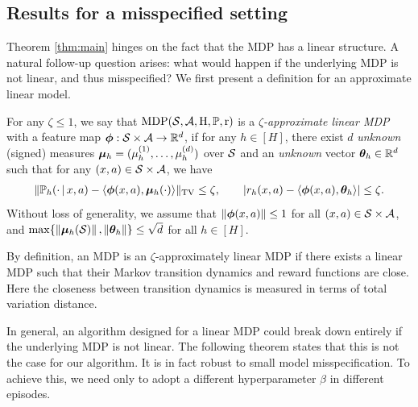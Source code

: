 

\subsection{Results for a misspecified setting}

Theorem \ref{thm:main} hinges on the fact that the MDP has a linear structure. A natural follow-up question arises: what would happen if the underlying MDP is not linear, and thus misspecified? We first present a definition for an approximate linear model.

 

\begin{assumption}\label{assumption:nearly_linear} For any $\zeta\le 1$, we say that
$\rm{MDP}(\mathcal{S}, \mathcal{A}, H, \mathbb{P}, r)$ is a \emph{$\zeta$-approximate linear MDP} with a feature map $\bm{\phi}: \mathcal{S} \times \mathcal{A} \rightarrow \mathbb{R}^d$, if for any $h\in [H]$, there exist $d$ \emph{unknown} (signed) measures $\bm{\mu}_h = (\mu_h^{(1)}, \ldots, \mu_h^{(d)})$ over $\mathcal{S}$ and an \emph{unknown} vector $\bm{\theta}_h \in \mathbb{R}^d$ such that for any $(x, a) \in \mathcal{S}\times \mathcal{A}$, we have 
\begin{align}\label{eq:nearly_linear_transition} 
\|\mathbb{P}_h(\cdot{\,|\,} x, a) -  \langle\bm{\phi}(x, a), \bm{\mu}_h(\cdot)\rangle \|_{\mathrm{TV}} \le \zeta, \qquad  
|r_h(x, a) - \langle\bm{\phi}(x, a), \bm{\theta}_h\rangle| \le \zeta.   
\end{align}
Without loss of generality, we assume that $\left\|{\bm{\phi}(x, a)}\right\| \le 1$ for all $(x,a ) \in \mathcal{S} \times \mathcal{A}$, and $\max\{\left\|{\bm{\mu}_h(\mathcal{S})}\right\|, \left\|{\bm{\theta}_h}\right\|\} \le \sqrt{d}$ for all $h \in [H]$.
\end{assumption}


By definition, an MDP is an $\zeta$-approximately linear MDP if there exists a linear MDP such that their Markov transition dynamics and reward functions are close. Here the closeness between transition dynamics is measured in terms of total variation distance. 
 
In general, an algorithm designed for a linear MDP could break down entirely if the underlying MDP is not linear. The following theorem states that this is not the case for our algorithm. It is in fact robust to small model misspecification. To achieve this, we need only to adopt a different hyperparameter $\beta$ in different episodes.


